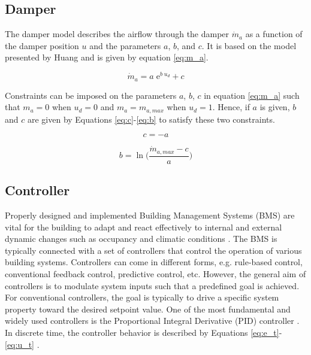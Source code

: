 \subsection{Damper}


The damper model describes the airflow through the damper $\dot{m}_a$ as a function of the damper position $u$ and the parameters $a$, $b$, and $c$. It is based on the model presented by Huang \cite{huang2011a} and is given by equation \autoref{eq:m_a}. 

\begin{equation}
    \dot{m}_{a} = a \; \mathrm{e}^{b \; u_d} + c
    \label{eq:m_a}
\end{equation}

Constraints can be imposed on the parameters $a$, $b$, $c$ in equation \autoref{eq:m_a} such that $m_a=0$ when $u_d=0$ and $m_a=m_{a,max}$ when $u_d=1$. Hence, if $a$ is given, $b$ and $c$ are given by Equations \ref{eq:c}-\ref{eq:b} to satisfy these two constraints.

\begin{equation}
    c = -a
    \label{eq:c}
\end{equation}

\begin{equation}
    b = \ln\Bigg(\frac{\dot{m}_{a,max}-c}{a}\Bigg)
    \label{eq:b}
\end{equation}

\subsection{Controller}
Properly designed and implemented Building Management Systems (BMS) are vital for the building to adapt and react effectively to internal and external dynamic changes such as occupancy and climatic conditions \cite{PANTAZARAS2016774}. The BMS is typically connected with a set of controllers that control the operation of various building systems. Controllers can come in different forms, e.g. rule-based control, conventional feedback control, predictive control, etc. However, the general aim of controllers is to modulate system inputs such that a predefined goal is achieved. For conventional controllers, the goal is typically to drive a specific system property toward the desired setpoint value. 
One of the most fundamental and widely used controllers is the Proportional Integral Derivative (PID) controller \cite{Belic2015}. In discrete time, the controller behavior is described by Equations \ref{eq:e_t}-\ref{eq:u_t} \cite{Veeranna2010}.

